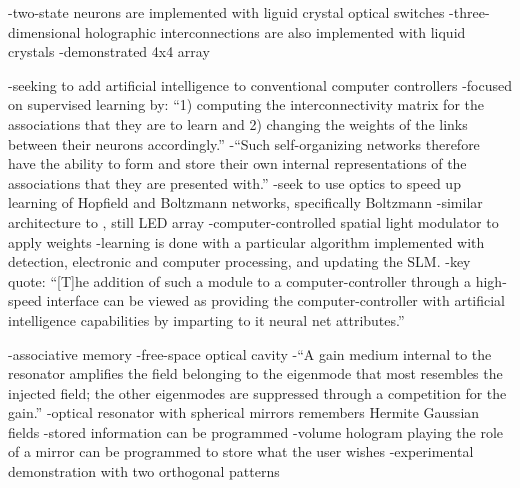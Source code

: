 \cite{jaju1988,}
-two-state neurons are implemented with liguid crystal optical switches
-three-dimensional holographic interconnections are also implemented with liquid crystals
-demonstrated 4x4 array

\cite{fa1987}
-seeking to add artificial intelligence to conventional computer controllers
-focused on supervised learning by: ``1) computing the interconnectivity matrix for the associations that they are to learn and 2) changing the weights of the links between their neurons accordingly.''
-``Such self-organizing networks therefore have the ability to form and store their own internal representations of the associations that they are presented with.''
-seek to use optics to speed up learning of Hopfield and Boltzmann networks, specifically Boltzmann
-similar architecture to \cite{faps1985}, still LED array
-computer-controlled spatial light modulator to apply weights
-learning is done with a particular algorithm implemented with detection, electronic and computer processing, and updating the SLM.
-key quote: ``[T]he addition of such a module to a computer-controller through a high-speed interface can be viewed as providing the computer-controller with artificial intelligence capabilities by imparting to it neural net attributes.''

\cite{an1986}
-associative memory
-free-space optical cavity
-``A gain medium internal to the resonator amplifies the field belonging to the eigenmode that most resembles the injected field; the other eigenmodes are suppressed through a competition for the gain.''
-optical resonator with spherical mirrors remembers Hermite Gaussian fields
-stored information can be programmed
-volume hologram playing the role of a mirror can be programmed to store what the user wishes
-experimental demonstration with two orthogonal patterns


